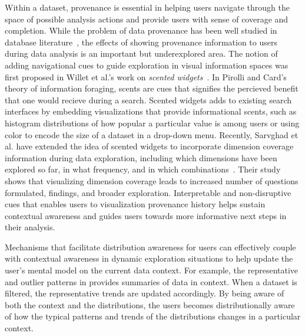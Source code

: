 \par Within a dataset, provenance is essential in helping users navigate through the space of possible analysis actions and provide users with sense of coverage and completion. While the problem of data provenance has been well studied in database literature~\cite{Buneman2006,Cui2003,Woodruff1997}, the effects of showing provenance information to users during data analysis is an important but underexplored area. The notion of adding navigational cues to guide exploration in visual information spaces was first proposed in Willet et al.'s work on \textit{scented widgets}~\cite{Willett2007}. In Pirolli and Card's theory of information foraging, scents are cues that signifies the percieved benefit that one would recieve during a search. Scented widgets adds to existing search interfaces by embedding visualizations that provide informational scents, such as histogram distributions of how popular a particular value is among users or using color to encode the size of a dataset in a drop-down menu. Recently, Sarvghad et al. have extended the idea of scented widgets to incorporate dimension coverage information during data exploration, including which dimensions have been explored so far, in what frequency, and in which combinations~\cite{Sarvghad2017}. Their study shows that visualizing dimension coverage leads to increased number of questions formulated, findings, and broader exploration. Interpretable and non-disruptive cues that enables users to visualization provenance history helps sustain contextual awareness and guides users towards more informative next steps in their analysis.%
\par Mechanisms that facilitate distribution awareness for users can effectively couple with contextual awareness in dynamic exploration situations to help update the user's mental model on the current data context. For example, the representative and outlier patterns in \zv provides summaries of data in context. When a dataset is filtered, the representative trends are updated accordingly. By being aware of both the context and the distributions, the users becomes distributionally aware of how the typical patterns and trends of the distributions changes in a particular context. %
